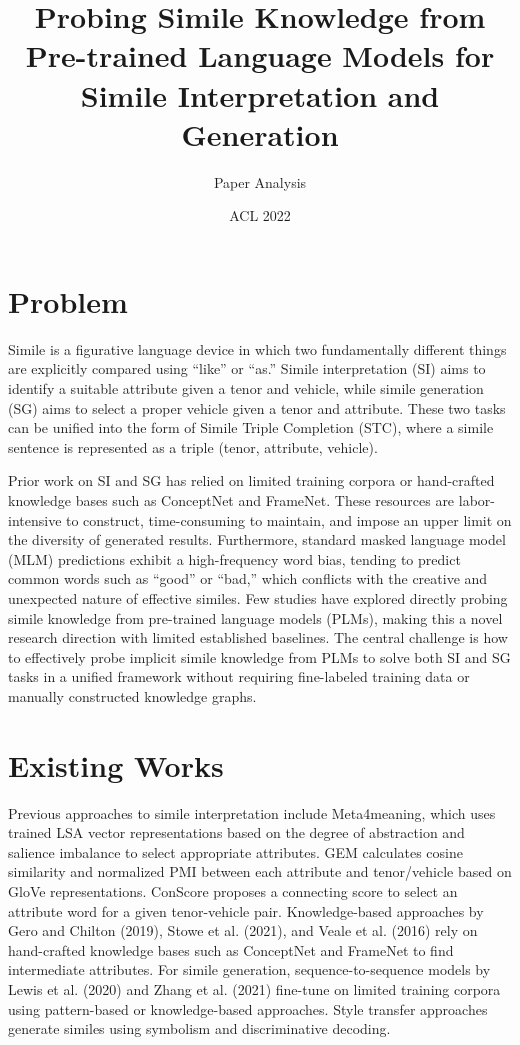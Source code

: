 \documentclass[12pt]{article}
\title{Probing Simile Knowledge from Pre-trained Language Models for Simile Interpretation and Generation}
\author{Paper Analysis}
\date{ACL 2022}
\begin{document}
\maketitle

\section{Problem}

Simile is a figurative language device in which two fundamentally different things are explicitly compared using ``like'' or ``as.'' Simile interpretation (SI) aims to identify a suitable attribute given a tenor and vehicle, while simile generation (SG) aims to select a proper vehicle given a tenor and attribute. These two tasks can be unified into the form of Simile Triple Completion (STC), where a simile sentence is represented as a triple (tenor, attribute, vehicle).

Prior work on SI and SG has relied on limited training corpora or hand-crafted knowledge bases such as ConceptNet and FrameNet. These resources are labor-intensive to construct, time-consuming to maintain, and impose an upper limit on the diversity of generated results. Furthermore, standard masked language model (MLM) predictions exhibit a high-frequency word bias, tending to predict common words such as ``good'' or ``bad,'' which conflicts with the creative and unexpected nature of effective similes. Few studies have explored directly probing simile knowledge from pre-trained language models (PLMs), making this a novel research direction with limited established baselines. The central challenge is how to effectively probe implicit simile knowledge from PLMs to solve both SI and SG tasks in a unified framework without requiring fine-labeled training data or manually constructed knowledge graphs.

\section{Existing Works}

Previous approaches to simile interpretation include Meta4meaning, which uses trained LSA vector representations based on the degree of abstraction and salience imbalance to select appropriate attributes. GEM calculates cosine similarity and normalized PMI between each attribute and tenor/vehicle based on GloVe representations. ConScore proposes a connecting score to select an attribute word for a given tenor-vehicle pair. Knowledge-based approaches by Gero and Chilton (2019), Stowe et al. (2021), and Veale et al. (2016) rely on hand-crafted knowledge bases such as ConceptNet and FrameNet to find intermediate attributes. For simile generation, sequence-to-sequence models by Lewis et al. (2020) and Zhang et al. (2021) fine-tune on limited training corpora using pattern-based or knowledge-based approaches. Style transfer approaches generate similes using symbolism and discriminative decoding.
\end{document}
